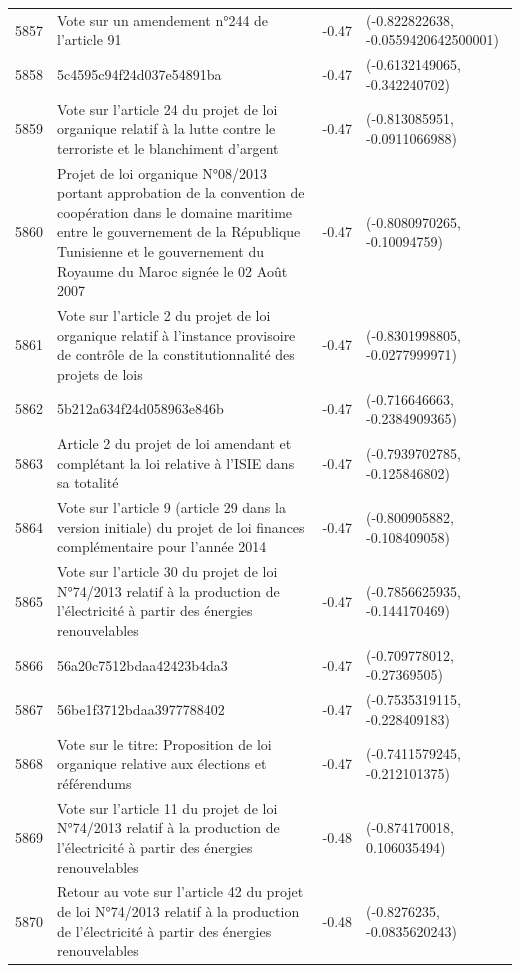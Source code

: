 \begin{table}[ht]
\begin{tabular}{rlrl}
  5857 & Vote sur un amendement n°244 de l'article 91 & -0.47 & (-0.822822638, -0.0559420642500001) \\ 
  5858 & 5c4595c94f24d037e54891ba & -0.47 & (-0.6132149065, -0.342240702) \\ 
  5859 & Vote sur l'article 24 du projet de loi organique relatif à la lutte contre le terroriste et le blanchiment d'argent & -0.47 & (-0.813085951, -0.0911066988) \\ 
  5860 & Projet de loi organique N°08/2013 portant approbation de la convention de coopération dans le domaine maritime entre le gouvernement de la République Tunisienne et le gouvernement du Royaume du Maroc signée le 02 Août 2007 & -0.47 & (-0.8080970265, -0.10094759) \\ 
  5861 & Vote sur l'article 2 du projet de loi organique relatif à l'instance provisoire de contrôle de la constitutionnalité des projets de lois & -0.47 & (-0.8301998805, -0.0277999971) \\ 
  5862 & 5b212a634f24d058963e846b & -0.47 & (-0.716646663, -0.2384909365) \\ 
  5863 & Article 2 du projet de loi amendant et complétant la loi relative à l'ISIE dans sa totalité & -0.47 & (-0.7939702785, -0.125846802) \\ 
  5864 & Vote sur l'article 9 (article 29 dans la version initiale) du projet de loi finances complémentaire pour l'année 2014 & -0.47 & (-0.800905882, -0.108409058) \\ 
  5865 & Vote sur l'article 30 du projet de loi N°74/2013 relatif à la production de l'électricité à partir des énergies renouvelables & -0.47 & (-0.7856625935, -0.144170469) \\ 
  5866 & 56a20c7512bdaa42423b4da3 & -0.47 & (-0.709778012, -0.27369505) \\ 
  5867 & 56be1f3712bdaa3977788402 & -0.47 & (-0.7535319115, -0.228409183) \\ 
  5868 & Vote sur le titre: Proposition de loi organique relative aux élections et référendums & -0.47 & (-0.7411579245, -0.212101375) \\ 
  5869 & Vote sur l'article 11 du projet de loi N°74/2013 relatif à la production de l'électricité à partir des énergies renouvelables & -0.48 & (-0.874170018, 0.106035494) \\ 
  5870 & Retour au vote sur l'article 42 du projet de loi N°74/2013 relatif à la production de l'électricité à partir des énergies renouvelables & -0.48 & (-0.8276235, -0.0835620243) \\ 

\end{tabular}
\end{table}
